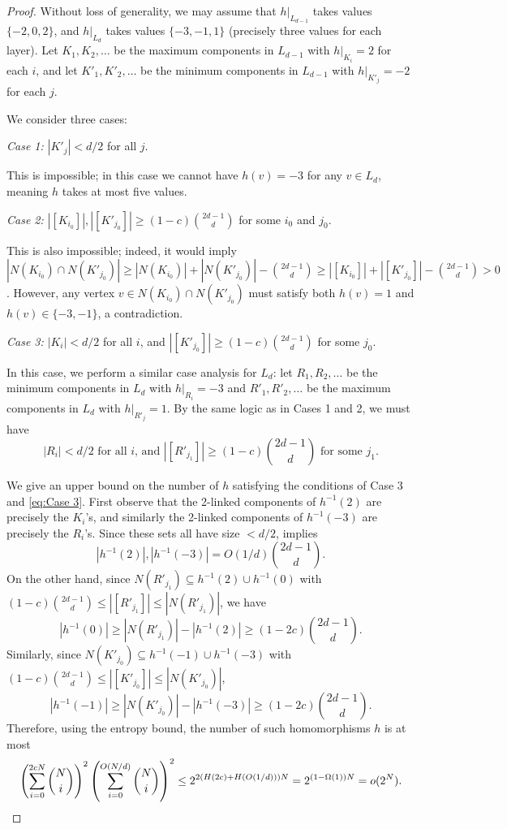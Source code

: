 \documentclass{amsart}
\theoremstyle{definition}
\newcommand{\beq}[1]{\begin{equation}\label{#1}}
\newcommand{\enq}[0]{\end{equation}}
\newcommand{\0}[0]{\emptyset}
\begin{document}
\begin{proof}
Without loss of generality, we may assume that $h|_{L_{d-1}}$ takes values $\{-2,0,2\}$, and $h|_{L_{d}}$ takes values $\{-3, -1, 1\}$ (precisely three values for each layer). Let $K_1, K_2, \ldots$ be the maximum components in $L_{d-1}$ with $h|_{K_i}=2$ for each $i$, and let $K'_1, K'_2, \ldots$ be the minimum components in $L_{d-1}$ with $h|_{K'_j}=-2$ for each $j$.

We consider three cases:

\noindent \textit{Case 1:} $|K'_j|<d/2$ for all $j$.

This is impossible; in this case we cannot have $h(v)=-3$ for any $v\in L_d$, meaning $h$ takes at most five values.

\noindent \textit{Case 2:} $|[K_{i_0}]|, |[K'_{j_0}]| \ge (1-c)\binom{2d-1}{d}$ for some $i_0$ and $j_0$.

This is also impossible; indeed, it would imply 
$|N(K_{i_0})\cap N(K'_{j_0})|\geq |N(K_{i_0})|+|N(K'_{j_0})|-\binom{2d-1}{d}\geq |[K_{i_0}]|+ |[K'_{j_0}]|-\binom{2d-1}{d}>0$. 
However, any vertex $v\in N(K_{i_0})\cap N(K'_{j_0})$ must satisfy both $h(v)=1$ and $h(v)\in\{-3,-1\}$, a contradiction.

\noindent \textit{Case 3:} $|K_i|<d/2$ for all $i$, and $|[K'_{j_0}]|\ge (1-c)\binom{2d-1}{d}$ for some $j_0$.

In this case, we perform a similar case analysis for $L_d$: let $R_1, R_2, \ldots$ be the minimum components in $L_d$ with $h|_{R_i}=-3$ and $R'_1, R'_2, \ldots$ be the maximum components in $L_d$ with $h|_{R'_j}=1$. By the same logic as in Cases 1 and 2, we must have
\beq{eq:Case 3} \text{$|R_i|<d/2$ for all $i$, and $|[R'_{j_1}]|\ge (1-c)\binom{2d-1}{d}$ for some $j_1$.}\enq

We give an upper bound on the number of $h$ satisfying the conditions of Case 3 and \eqref{eq:Case 3}. First observe that the 2-linked components of $h^{-1}(2)$ are precisely the $K_i$'s, and similarly the 2-linked components of $h^{-1}(-3)$ are precisely the $R_i$'s. Since these sets all have size $<d/2$,  implies
\beq{eq:h-1}
|h^{-1}(2)|, |h^{-1}(-3)| = O(1/d)\binom{2d-1}{d}.
\enq
On the other hand, since $N(R'_{j_1})\subseteq  h^{-1}(2)\cup h^{-1}(0)$ with $(1-c)\binom{2d-1}{d}\leq |[R'_{j_1}]|\leq |N(R'_{j_1})|$, we have
\beq{eq:h-2}
|h^{-1}(0)|\ge |N(R'_{j_1})|-|h^{-1}(2)|\geq (1-2c)\binom{2d-1}{d}.
\enq
Similarly, since $N(K'_{j_0})\subseteq  h^{-1}(-1)\cup h^{-1}(-3)$ with $(1-c)\binom{2d-1}{d}\leq |[K'_{j_0}]|\leq |N(K'_{j_0})|$,
\beq{eq:h-3}
|h^{-1}(-1)|\geq |N(K'_{j_0})|-|h^{-1}(-3)|\ge (1-2c)\binom{2d-1}{d}.
\enq
Therefore, using the entropy bound, the number of such homomorphisms $h$ is at most 
\[
\left(\sum_{i=0}^{2c N}\binom{N}{i}\right)^2\left(\sum_{i=0}^{O(N/d)}\binom{N}{i}\right)^2\leq 2^{2(H(2c)+H(O(1/d)))N}=2^{(1-\Omega(1))N} = o(2^N).  \qedhere
\]
\end{proof}
\end{document}
